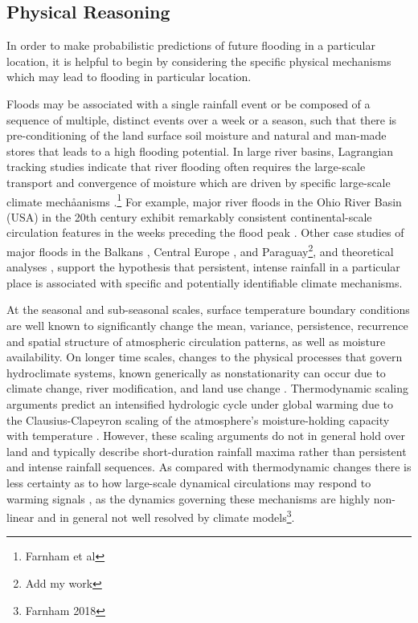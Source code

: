 \documentclass[11pt]{article}
\begin{document}
\subsection{Physical Reasoning}

In order to make probabilistic predictions of future flooding in a particular location, it is helpful to begin by considering the specific physical mechanisms which may lead to flooding in particular location.

Floods may be associated with a single rainfall event or be composed of a sequence of multiple, distinct events over a week or a season, such that there is pre-conditioning of the land surface soil moisture and natural and man-made stores that leads to a high flooding potential.
In large river basins, Lagrangian tracking studies \citep{Gimeno2010} indicate that river flooding often requires the large-scale transport and convergence of moisture  which are driven by specific large-scale climate mechåanisms \citep{Dacre2014,Gimeno2014,Lu2013,Dirmeyer2010}.\footnote{Farnham et al}
For example, major river floods in the Ohio River Basin (USA) in the 20th century exhibit remarkably consistent continental-scale circulation features in the weeks preceding the flood peak \citep{Nakamura2012,Robertson2015}.
Other case studies of  major floods in the Balkans \citep{Stadtherr2016}, Central Europe \citep{Grams2014}, and Paraguay\footnote{Add my work}, and theoretical analyses \citep{Hoskins2015,Screen2014,Coumou2014}, support the hypothesis that persistent, intense rainfall in a particular place is associated with specific and potentially identifiable climate mechanisms.

At the seasonal and sub-seasonal scales, surface temperature boundary conditions are well known to significantly change the mean, variance, persistence, recurrence and spatial structure of atmospheric circulation patterns, as well as moisture availability.
On longer time scales, changes to the physical processes that govern hydroclimate systems, known generically as nonstationarity \citep{Milly2008} can occur due to climate change, river modification, and land use change \citep{Merz2014}.
Thermodynamic scaling arguments predict an intensified hydrologic cycle under global warming due to the Clausius-Clapeyron scaling of the atmosphere's moisture-holding capacity with temperature \citep[see][]{Muller2011,OGorman2015}.
However, these scaling arguments do not in general hold over land \citep{Byrne2015} and typically describe short-duration rainfall maxima rather than persistent and intense rainfall sequences.
As compared with thermodynamic changes there is less certainty as to how large-scale dynamical circulations may respond to warming signals \citep{Shaw2016,Barnes2015}, as the dynamics governing these mechanisms are highly non-linear \citep{Palmer2013} and in general not well resolved by climate models\footnote{Farnham 2018}.
\end{document}
